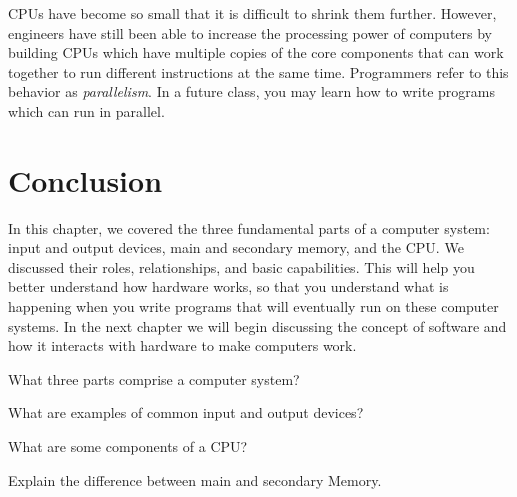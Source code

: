 CPUs have become so small that it is difficult to shrink them further. However, engineers have still been able to increase the processing power of computers by building CPUs which have multiple copies of the core components that can work together to run different instructions at the same time. Programmers refer to this behavior as \emph{parallelism}. In a future class, you may learn how to write programs which can run in parallel.


\section {Conclusion}

In this chapter, we covered the three fundamental parts of a computer system: input and output devices, main and secondary memory, and the CPU. We discussed their roles, relationships, and basic capabilities. This will help you better understand how hardware works, so that you understand what is happening when you write programs that will eventually run on these computer systems. In the next chapter we will begin discussing the concept of software and how it interacts with hardware to make computers work.

\exercisesection

\begin{exercise}
What three parts comprise a computer system?
\end{exercise}

\begin{exercise}
What are examples of common input and output devices?
\end{exercise}

\begin{exercise}
What are some components of a CPU?
\end{exercise}

\begin{exercise}
Explain the difference between main and secondary Memory.
\end{exercise}
